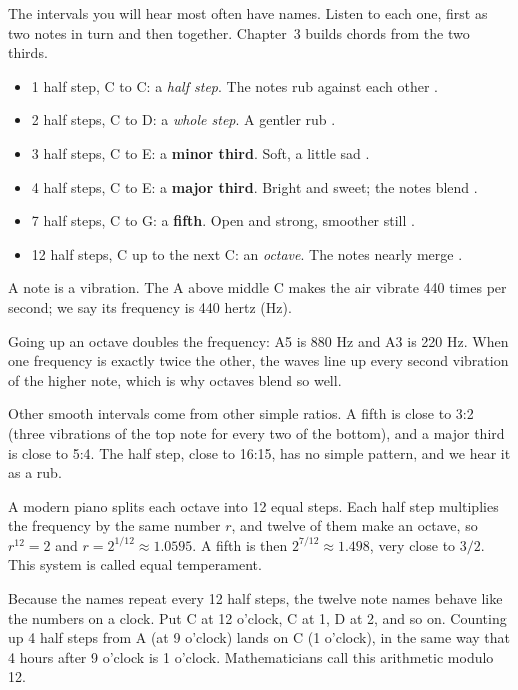 The intervals you will hear most often have names. Listen to each one, first as two notes in turn and then together. Chapter~3 builds chords from the two thirds.
\begin{itemize}
  \item 1 half step, C to C\sh: a \emph{half step}. The notes rub against each other .
  \item 2 half steps, C to D: a \emph{whole step}. A gentler rub .
  \item 3 half steps, C to E\fl: a \textbf{minor third}. Soft, a little sad .
  \item 4 half steps, C to E: a \textbf{major third}. Bright and sweet; the notes blend .
  \item 7 half steps, C to G: a \textbf{fifth}. Open and strong, smoother still .
  \item 12 half steps, C up to the next C: an \emph{octave}. The notes nearly merge .
\end{itemize}

\begin{curiousbox}
A note is a vibration. The A above middle C makes the air vibrate 440 times per second; we say its frequency is 440 hertz (Hz).

Going up an octave doubles the frequency: A5 is 880 Hz and A3 is 220 Hz. When one frequency is exactly twice the other, the waves line up every second vibration of the higher note, which is why octaves blend so well.

Other smooth intervals come from other simple ratios. A fifth is close to 3:2 (three vibrations of the top note for every two of the bottom), and a major third is close to 5:4. The half step, close to 16:15, has no simple pattern, and we hear it as a rub.

A modern piano splits each octave into 12 equal steps. Each half step multiplies the frequency by the same number $r$, and twelve of them make an octave, so $r^{12} = 2$ and $r = 2^{1/12} \approx 1.0595$. A fifth is then $2^{7/12} \approx 1.498$, very close to $3/2$. This system is called equal temperament.

Because the names repeat every 12 half steps, the twelve note names behave like the numbers on a clock. Put C at 12 o'clock, C\sh{} at 1, D at 2, and so on. Counting up 4 half steps from A (at 9 o'clock) lands on C\sh{} (1 o'clock), in the same way that 4 hours after 9 o'clock is 1 o'clock. Mathematicians call this arithmetic modulo 12.
\end{curiousbox}

